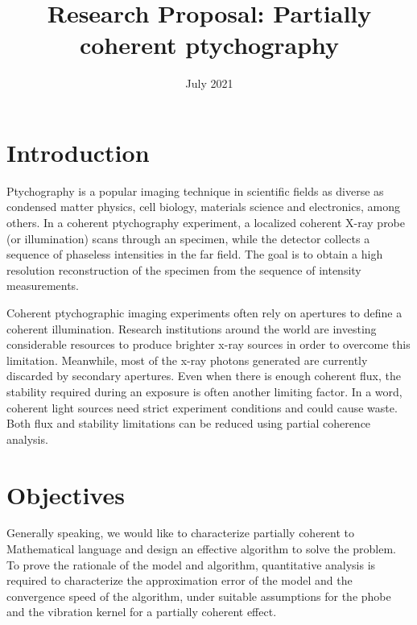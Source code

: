 \documentclass{article}
\title{Research Proposal: Partially coherent ptychography}
\date{July 2021}
\numberwithin{equation}{section}
\begin{document}
\maketitle
\tableofcontents
\section{Introduction}

Ptychography is a popular imaging technique in scientific fields as diverse as condensed matter physics, cell biology, materials science and electronics, among others. In a coherent ptychography experiment, a localized coherent X-ray probe (or illumination) scans through an specimen, while the detector collects a sequence of phaseless intensities in the far field. The goal is to obtain a high resolution reconstruction of the specimen from the sequence of intensity measurements. 

Coherent ptychographic imaging experiments often rely on apertures to define a coherent illumination. Research institutions around the world are investing considerable resources to produce brighter x-ray sources in order to overcome this limitation. Meanwhile, most of the x-ray photons generated are currently discarded by secondary apertures. Even when there is enough coherent flux, the stability required during an exposure is often another limiting factor. In a word, coherent light sources need strict experiment conditions and could cause waste. Both flux and stability limitations can be reduced using partial coherence analysis. 



\section{Objectives}

Generally speaking, we would like to characterize partially coherent to Mathematical language and design an effective algorithm to solve the problem. To prove the rationale of the model and algorithm, quantitative analysis is required to characterize the approximation error of the model and the convergence speed of the algorithm, under suitable assumptions for the phobe and the vibration kernel for a partially coherent effect.
\end{document}
